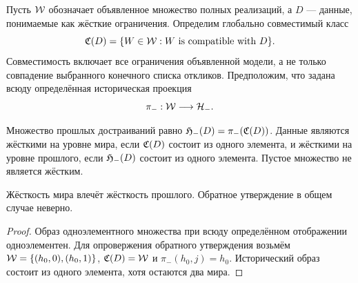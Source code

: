 \section{}
\label{sec:sets}
{Пусть $\Wcal$ обозначает объявленное множество полных реализаций, а $D$ --- данные, понимаемые как жёсткие ограничения. Определим глобально совместимый класс}
\begin{equation}\label{eq:completion}
\Ccal(D)=\{W\in\Wcal:W\text{ \Lang{is compatible with}{совместим с} }D\}.
\end{equation}
{Совместимость включает все ограничения объявленной модели, а не только совпадение выбранного конечного списка откликов. Предположим, что задана всюду определённая историческая проекция}
\[
\pi_-:\Wcal\longrightarrow\Hminus.
\]
\begin{definition}
\label{def:past}
{Множество прошлых достраиваний равно $\Pcal(D)=\pi_-(\Ccal(D))$. Данные являются жёсткими на уровне мира, если $\Ccal(D)$ состоит из одного элемента, и жёсткими на уровне прошлого, если $\Pcal(D)$ состоит из одного элемента. Пустое множество не является жёстким.}
\end{definition}

\begin{proposition}
\label{prop:world-past}
{Жёсткость мира влечёт жёсткость прошлого. Обратное утверждение в общем случае неверно.}
\end{proposition}
\begin{proof}
{Образ одноэлементного множества при всюду определённом отображении одноэлементен. Для опровержения обратного утверждения возьмём $\Wcal=\{(h_0,0),(h_0,1)\}$, $\Ccal(D)=\Wcal$ и $\pi_-(h_0,j)=h_0$. Исторический образ состоит из одного элемента, хотя остаются два мира.}
\end{proof}

